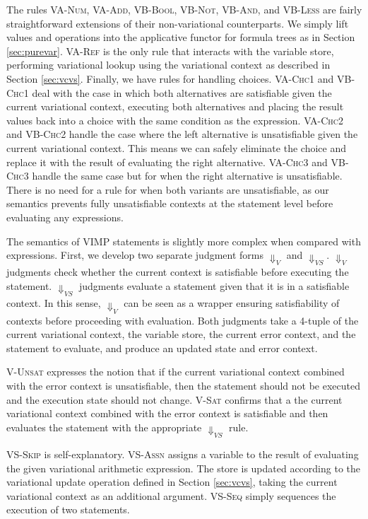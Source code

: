 \documentclass[12pt,oneside]{book}
\begin{document}
The rules \textsc{VA-Num}, \textsc{VA-Add}, \textsc{VB-Bool}, \textsc{VB-Not}, \textsc{VB-And}, and \textsc{VB-Less} are
fairly straightforward extensions of their non-variational counterparts. We simply lift values and operations into the applicative
functor for formula trees as in Section \ref{sec:purevar}. \textsc{VA-Ref} is the only rule that interacts with the variable store,
performing variational lookup using the variational context as described in Section \ref{sec:vcvs}. Finally, we have rules for 
handling choices. \textsc{VA-Chc1} and \textsc{VB-Chc1} deal with the case in which both alternatives are satisfiable given
the current variational context, executing both alternatives and placing the result values back into a choice with the same
condition as the expression. \textsc{VA-Chc2} and \textsc{VB-Chc2} handle the case where the left alternative is unsatisfiable
given the current variational context. This means we can safely eliminate the choice and replace it with the result of evaluating the right alternative.
\textsc{VA-Chc3} and \textsc{VB-Chc3} handle the same case but for when the right alternative is unsatisfiable. There is no need for a rule for when
both variants are unsatisfiable, as our semantics prevents fully unsatisfiable contexts at the statement level before evaluating any expressions.


The semantics of VIMP statements is slightly more complex when compared with expressions. First, we develop two separate
judgment forms $\Downarrow_V$ and $\Downarrow_{VS}$. $\Downarrow_V$ judgments check whether the current context is satisfiable
before executing the statement. $\Downarrow_{VS}$ judgments evaluate a statement given that it is in a satisfiable context. In this sense, $\Downarrow_V$
can be seen as a wrapper ensuring satisfiability of contexts before proceeding with evaluation. Both judgments take a 4-tuple of the current variational context,
the variable store, the current error context, and the statement to evaluate, and produce an updated state and error context.

\textsc{V-Unsat} expresses the notion that if the current variational context combined with the error context is unsatisfiable, then the statement should
not be executed and the execution state should not change. \textsc{V-Sat} confirms that a the current variational context combined with the error context
is satisfiable and then evaluates the statement with the appropriate $\Downarrow_{VS}$ rule.

\textsc{VS-Skip} is self-explanatory. \textsc{VS-Assn} assigns a variable to the result of evaluating the given variational arithmetic expression.
The store is updated according to the variational update operation defined in Section \ref{sec:vcvs}, taking the current variational context as an additional argument.
\textsc{VS-Seq} simply sequences the execution of two statements.
\end{document}
